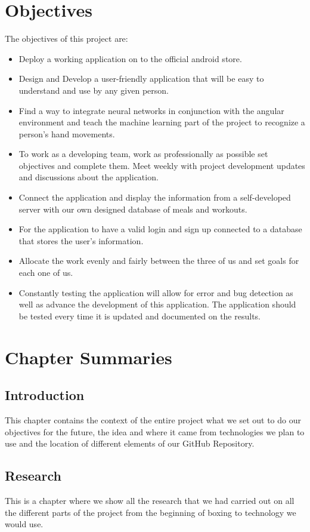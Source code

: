 \documentclass[a4paper,12pt]{report}
\begin{document}
\section{Objectives}
The objectives of this project are:
\begin{itemize}
\item Deploy a working application on to the official android store.
\item Design and Develop a user-friendly application that will be easy to understand and use by any given person.
\item  Find a way to integrate neural networks in conjunction with the angular environment and teach the machine learning part of the project to recognize a person's hand movements.
\item To work as a developing team, work as professionally as possible set objectives and complete them. Meet weekly with project development updates and discussions about the application.  
\item Connect the application and display the information from a self-developed server with our own designed database of meals and workouts.
\item For the application to have a valid login and sign up connected to a database that stores the user's information.
\item Allocate the work evenly and fairly between the three of us and set goals for each one of us.
\item Constantly testing the application will allow for error and bug detection as well as advance the development of this application. The application should be tested every time it is updated and documented on the results.  
\end{itemize}

\section{Chapter Summaries}
\subsection{Introduction}
This chapter contains the context of the entire project what we set out to do our objectives for the future, the idea and where it came from technologies we plan to use and the location of different elements of our GitHub Repository. 
\subsection{Research}
This is a chapter where we show all the research that we had carried out on all the different parts of the project from the beginning of boxing to technology we would use.
\end{document}
